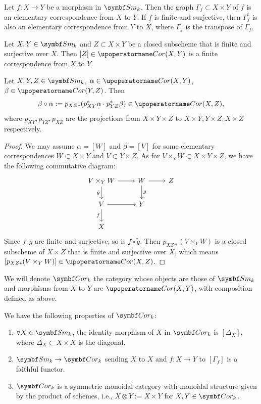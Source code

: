  \begin{example}
    Let $f: X\to Y$ be a morphism in $\Sm_k$. 
    Then the graph $\Gamma_f\subset X\times Y$ of $f$ is an elementary correspondence from $X$ to $Y$.
    If $f$ is finite and surjective, then $\Gamma_f^\mathrm{t}$ is also an elementary correspondence from $Y$ to $X$, where $\Gamma_f^\mathrm{t}$ is the transpose of $\Gamma_f$.
  \end{example}

  \begin{example}
    Let $X,Y \in \Sm_k$ and $Z\subset X\times Y$ be a closed subscheme that is finite and surjective over $X$. 
    Then $[Z] \in \Cone(X,Y)$ is a finite correspondence from $X$ to $Y$.
  \end{example}

  \begin{lemma}
    Let $X,Y,Z\in \Sm_k$, $\alpha\in \Cone(X,Y)$, $\beta\in \Cone(Y,Z)$. 
    Then 
    \[ \beta\circ \alpha := p_{XZ*}(p_{XY}^*\alpha \cdot p_{YZ}^*\beta) \in \Cone(X,Z), \]
    where $p_{XY}, p_{YZ}, p_{XZ}$ are the projections from $X\times Y\times Z$ to $X\times Y, Y\times Z, X\times Z$ respectively.
  \end{lemma}
  \begin{proof}
    We may assume $\alpha = [W]$ and $\beta = [V]$ for some elementary correspondences $W\subset X\times Y$ and $V\subset Y\times Z$. 
    As for $V \times_Y W \subset X\times Y\times Z$, we have the following commutative diagram:
    \[ \begin{tikzcd}
      V \times_Y W \ar[r] \ar[d, "\tilde{g}"'] & W \ar[d, "g"] \ar[r] & Z \\
      V \ar[r] \ar[d, "f"'] & Y &  \\
      X & &
    \end{tikzcd} \]
    Since $f,g$ are finite and surjective, so is $f\circ \tilde{g}$.
    Then $p_{XZ*}(V \times_Y W)$ is a closed subscheme of $X\times Z$ that is finite and surjective over $X$, which means $[p_{XZ*}(V \times_Y W)] \in \Cone(X,Z)$.
  \end{proof}

  We will denote $\Cor_k$ the category whose objects are those of $\Sm_k$ and morphisms from $X$ to $Y$ are $\Cone(X,Y)$, with composition defined as above.

  \begin{proposition}
    We have the following properties of $\Cor_k$:
    \begin{enumerate}
      \item $\forall X\in \Sm_k$, the identity morphism of $X$ in $\Cor_k$ is $[\Delta_X]$, where $\Delta_X\subset X\times X$ is the diagonal.
      \item $\Sm_k \to \Cor_k$ sending $X$ to $X$ and $f: X\to Y$ to $[\Gamma_f]$ is a faithful functor.
      \item $\Cor_k$ is a symmetric monoidal category with monoidal structure given by the product of schemes, i.e., $X\otimes Y := X\times Y$ for $X,Y\in \Cor_k$.
    \end{enumerate}
  \end{proposition}

